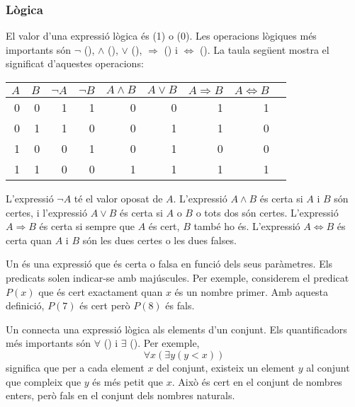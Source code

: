 \subsubsection{Lògica}


El valor d'una expressió lògica és
 (1) o  (0).
Les operacions lògiques més importants són
$\lnot$ (),
$\land$ (),
$\lor$ (),
$\Rightarrow$ () i
$\Leftrightarrow$ ().
La taula següent mostra el significat d'aquestes operacions:

\begin{center}
\begin{tabular}{rr|rrrrrrr}
$A$ & $B$ & $\lnot A$ & $\lnot B$ & $A \land B$ & $A \lor B$ & $A \Rightarrow B$ & $A \Leftrightarrow B$ \\
\hline
0 & 0 & 1 & 1 & 0 & 0 & 1 & 1 \\
0 & 1 & 1 & 0 & 0 & 1 & 1 & 0 \\
1 & 0 & 0 & 1 & 0 & 1 & 0 & 0 \\
1 & 1 & 0 & 0 & 1 & 1 & 1 & 1 \\
\end{tabular}
\end{center}

L'expressió $\lnot A$ té el valor oposat de $A$.
L'expressió $A \land B$ és certa si $A$ i $B$
són certes,
i l'expressió $A \lor B$ és certa si $A$ o $B$ o tots dos
són certes.
L'expressió $A \Rightarrow B$ és certa
si sempre que $A$ és cert, $B$ també ho és.
L'expressió $A \Leftrightarrow B$ és certa
quan $A$ i $B$ són les dues certes o les dues falses.


Un  és una expressió que és certa o falsa
en funció dels seus paràmetres.
Els predicats solen indicar-se amb majúscules.
Per exemple, considerem el predicat $P(x)$
que és cert exactament quan $x$ és un nombre primer.
Amb aquesta definició, $P(7)$ és cert però $P(8)$ és fals.


Un  connecta una expressió lògica
als elements d'un conjunt.
Els quantificadors més importants són
$\forall$ () i $\exists$ ().
Per exemple,
\[\forall x (\exists y (y <x))\]
significa que per a cada element $x$ del conjunt,
existeix un element $y$ al conjunt
que compleix que $y$ és més petit que $x$.
Això és cert en el conjunt de nombres enters,
però fals en el conjunt dels nombres naturals.

